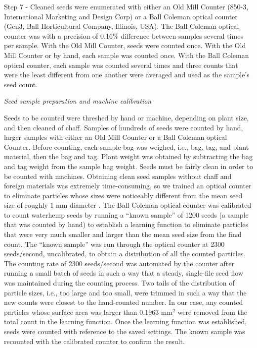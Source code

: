 \documentclass[
]{article}
\begin{document}
Step 7 - Cleaned seeds were enumerated with either an Old Mill Counter (850-3, International Marketing and Design Corp) or a Ball Coleman optical counter (Gen3, Ball Horticultural Company, Illinois, USA). The Ball Coleman optical counter was with a precision of 0.16\% difference between samples several times per sample. With the Old Mill Counter, seeds were counted once. With the Old Mill Counter or by hand, each sample was counted once. With the Ball Coleman optical counter, each sample was counted several times and three counts that were the least different from one another were averaged and used as the sample's seed count.

\emph{Seed sample preparation and machine calibration}

Seeds to be counted were threshed by hand or machine, depending on plant size, and then cleaned of chaff.
Samples of hundreds of seeds were counted by hand, larger samples with either an Old Mill Counter or a Ball Coleman optical Counter. Before counting, each sample bag was weighed, i.e., bag, tag, and plant material, then the bag and tag.
Plant weight was obtained by subtracting the bag and tag weight from the sample bag weight.
Seeds must be fairly clean in order to be counted with machines.
Obtaining clean seed samples without chaff and foreign materials was extremely time-consuming, so we trained an optical counter to eliminate particles whose sizes were noticeably different from the mean seed size of roughly 1 mm diameter \citep{bellTimeRequirementPollination2010}.
The Ball Coleman optical counter was calibrated to count waterhemp seeds by running a ``known sample'' of 1200 seeds (a sample that was counted by hand) to establish a learning function to eliminate particles that were very much smaller and larger than the mean seed size from the final count.
The ``known sample'' was run through the optical counter at 2300 seeds/second, uncalibrated, to obtain a distribution of all the counted particles.
The counting rate of 2300 seeds/second was automated by the counter after running a small batch of seeds in such a way that a steady, single-file seed flow was maintained during the counting process.
Two tails of the distribution of particle sizes, i.e., too large and too small, were trimmed in such a way that the new counts were closest to the hand-counted number.
In our case, any counted particles whose surface area was larger than 0.1963 mm\(^2\) were removed from the total count in the learning function.
Once the learning function was established, seeds were counted with reference to the saved settings.
The known sample was recounted with the calibrated counter to confirm the result.
\end{document}
